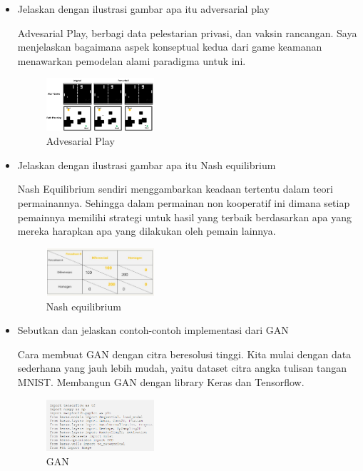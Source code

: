 \begin{enumerate}
\begin{itemize}
        \item Jelaskan dengan ilustrasi gambar apa itu adversarial play

Advesarial Play, berbagi data pelestarian privasi, dan vaksin rancangan. Saya menjelaskan bagaimana aspek konseptual kedua dari game keamanan menawarkan pemodelan alami paradigma untuk ini.

	\begin{figure}[H]
		\includegraphics[width=4cm]{figures/1174008/8/teori6.PNG}
            	\centering
           	 \caption{Advesarial Play}
       	 \end{figure}

        \item Jelaskan dengan ilustrasi gambar apa itu Nash equilibrium

Nash Equilibrium sendiri menggambarkan keadaan tertentu dalam teori permainannya. Sehingga dalam permainan non kooperatif ini dimana setiap pemainnya memilihi strategi untuk hasil yang terbaik berdasarkan apa yang mereka harapkan apa yang dilakukan oleh pemain lainnya.

	\begin{figure}[H]
		\includegraphics[width=4cm]{figures/1174008/8/teori7.PNG}
            	\centering
           	 \caption{Nash equilibrium}
       	 \end{figure}

        \item Sebutkan dan jelaskan contoh-contoh implementasi dari GAN

Cara membuat GAN dengan citra beresolusi tinggi. Kita mulai dengan data sederhana yang jauh lebih mudah, yaitu dataset citra angka tulisan tangan MNIST. Membangun GAN dengan library Keras dan Tensorflow. 

	\begin{figure}[H]
		\includegraphics[width=4cm]{figures/1174008/8/teori8.PNG}
            	\centering
           	 \caption{GAN}
       	 \end{figure}


\end{itemize}
\end{enumerate}
